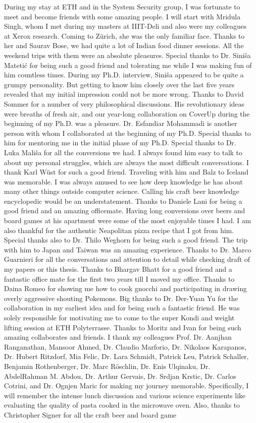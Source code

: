 During my stay at ETH and in the System Security group, I was fortunate to meet and become friends with some amazing people. I will start with Mridula Singh, whom I met during my masters at IIIT-Deli and also were my colleagues at Xerox research. Coming to Z\"urich, she was the only familiar face. Thanks to her and Saurav Bose, we had quite a lot of Indian food dinner sessions. All the weekend trips with them were an absolute pleasures. Special thanks to Dr. Sini\v{s}a Mateti\'c for being such a good friend and tolerating me while I was making fun of him countless times. During my Ph.D. interview, Sini\v{s}a appeared to be quite a grumpy personality. But getting to know him closely over the last five years revealed that my initial impression could not be more wrong. Thanks to David Sommer for a number of very philosophical discussions. His revolutionary ideas were breaths of fresh air, and our year-long collaboration on CoverUp during the beginning of my Ph.D. was a pleasure. Dr. Esfandiar Mohammadi is another person with whom I collaborated at the beginning of my Ph.D. Special thanks to him for mentoring me in the initial phase of my Ph.D. Special thanks to Dr. Luka Mali\v{s}a for all the conversions we had. I always found him easy to talk to about my personal struggles, which are always the most difficult conversations. I thank Karl W\"ust for such a good friend. Traveling with him and Balz to Iceland was memorable. I was always amused to see how deep knowledge he has about many other things outside computer science. Calling his craft beer knowledge encyclopedic would be an understatement. Thanks to Daniele Lani for being a good friend and an amazing officemate. Having long conversions over beers and board games at his apartment were some of the most enjoyable times I had. I am also thankful for the authentic Neapolitan pizza recipe that I got from him. Special thanks also to Dr. Thilo Weghorn for being such a good friend. The trip with him to Japan and Taiwan was an amazing experience. Thanks to Dr. Marco Guarnieri for all the conversations and attention to detail while checking draft of my papers or this thesis. Thanks to Bhargav Bhatt for a good friend and a fantastic office mate for the first two years till I moved my office. Thanks to Daina Romeo for showing me how to cook gnocchi and participating in drawing overly aggressive shouting Pokemons. Big thanks to Dr. Der-Yuan Yu for the collaboration in my earliest idea and for being such a fantastic friend. He was solely responsible for motivating me to come to the super Kondi and weight lifting session at ETH Polyterrasse. Thanks to Moritz and Ivan for being such amazing collaborates and friends. I thank my colleagues  Prof. Dr. Aanjhan Ranganathan, Mansoor Ahmed, Dr. Claudio Marforio, Dr. Nikolaos Karapanos, Dr. Hubert Ritzdorf, Mia Felic, Dr. Lara Schmidt, Patrick Leu, Patrick Schaller, Benjamin Rothenberger, Dr. Marc R\"oschlin, Dr. Enis Ulqinaku, Dr. AbdelRahman M. Abdou, Dr. Arthur Gervais, Dr. Srdjan Krstic, Dr. Carlos Cotrini, and Dr. Ognjen Maric for making my journey memorable. Specifically, I will remember the intense lunch discussion and various science experiments like evaluating the quality of pasta cooked in the microwave oven. Also, thanks to Christopher Signer for all the craft beer and board game 